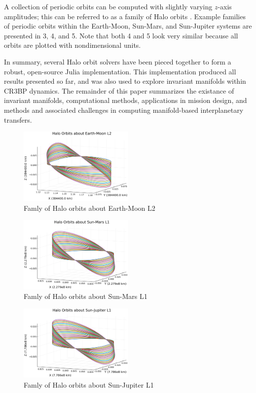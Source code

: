 \documentclass[conf]{new-aiaa}
\begin{document}
\begin{multicols}{2}
A collection of periodic orbits can be computed with slightly varying 
$z$-axis amplitudes; this can be referred to as a family of Halo orbits
\cite{rund2018interplanetary}. 
Example families of periodic orbits within the Earth-Moon, Sun-Mars, 
and Sun-Jupiter systems are presented in \figurename{3}, \figurename{4},
and \figurename{5}. Note that both \figurename{4} and \figurename{5} 
look very similar because all orbits are plotted with nondimensional units.

In summary, several Halo orbit solvers have been pieced together to form 
a robust, open-source Julia implementation. This implementation produced 
all results presented so far, and was also used to explore invariant 
manifolds within CR3BP dynamics. The remainder of this paper summarizes
the existance of invariant manifolds, computational methods, 
applications in mission design, and methods and associated challenges 
in computing manifold-based interplanetary transfers. 

\begin{figure}[H]
    \hskip -0.3cm
    \includegraphics[width=0.5\textwidth]{halo_family.png}
    \caption{Famly of Halo orbits about Earth-Moon L2}
\end{figure}

\begin{figure}[H]
    \hskip -0.3cm
    \includegraphics[width=0.5\textwidth]{halo_family_sm1.png}
    \caption{Famly of Halo orbits about Sun-Mars L1}
\end{figure}

\begin{figure}[H]
    \hskip -0.3cm
    \includegraphics[width=0.5\textwidth]{halo_family_sj1.png}
    \caption{Famly of Halo orbits about Sun-Jupiter L1}
\end{figure}


\end{multicols}
\end{document}
